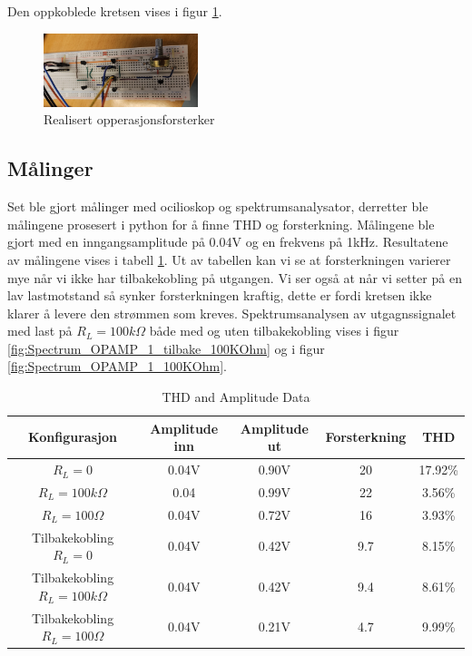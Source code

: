 Den oppkoblede kretsen vises i figur \ref{fig:diffamp_realisert}.

\begin{figure}[!h]
    \centering
    \includegraphics[width=0.4\textwidth, angle=90]{Bilder/feilBilde.jpg}
    \caption{Realisert opperasjonsforsterker}
    \label{fig:diffamp_realisert}
\end{figure}

\clearpage
\subsection{Målinger}
Set ble gjort målinger med ocilioskop og spektrumsanalysator, derretter ble målingene prosesert i python for å finne THD og forsterkning. Målingene ble gjort med en inngangsamplitude på 0.04V og en frekvens på 1kHz. Resultatene av målingene vises i tabell \ref{tab:THD_and_Amplitude_Data}. Ut av tabellen kan vi se at forsterkningen varierer mye når vi ikke har tilbakekobling på utgangen. Vi ser også at når vi setter på en lav lastmotstand så synker forsterkningen kraftig, dette er fordi kretsen ikke klarer å levere den strømmen som kreves. Spektrumsanalysen av utgagnssignalet med last på $R_L = 100k\Omega$ både med og uten tilbakekobling vises i figur \ref{fig:Spectrum_OPAMP_1_tilbake_100KOhm} og i figur \ref{fig:Spectrum_OPAMP_1_100KOhm}. 

\begin{table}[h!]
    \centering
    \begin{tabular}{ |c|c|c|c|c| }
        \hline
        Konfigurasjon & Amplitude inn & Amplitude ut & Forsterkning &THD\\
        \hline
        $R_L = 0$ & 0.04V & 0.90V & 20 &17.92\% \\
        $R_L = 100k\Omega$ & 0.04 & 0.99V & 22& 3.56\% \\
        $R_L = 100\Omega$ & 0.04V & 0.72V & 16& 3.93\% \\
        \hline
        Tilbakekobling $R_L =0$& 0.04V & 0.42V & 9.7& 8.15\% \\
        Tilbakekobling $R_L =100k\Omega$ & 0.04V & 0.42V & 9.4& 8.61\% \\
        Tilbakekobling $R_L =100\Omega$ & 0.04V & 0.21V & 4.7& 9.99\% \\
        \hline
    \end{tabular}
    \caption{THD and Amplitude Data}
    \label{tab:THD_and_Amplitude_Data}
  \end{table}


